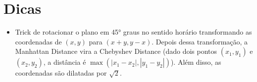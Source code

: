     \section{Dicas}
    \begin{itemize}
        \item Trick de rotacionar o plano em 45° graus no sentido horário transformando as coordenadas de $(x,y)$ para $(x+y,y-x)$. Depois dessa transformação, a Manhattan Distance vira a Chebyshev Distance (dado dois pontos $(x_1,y_1)$ e $(x_2,y_2)$, a distância é $\max(|x_1-x_2|,|y_1-y_2|)$). Além disso, as coordenadas são dilatadas por $\sqrt{2}$.
    \end{itemize}
